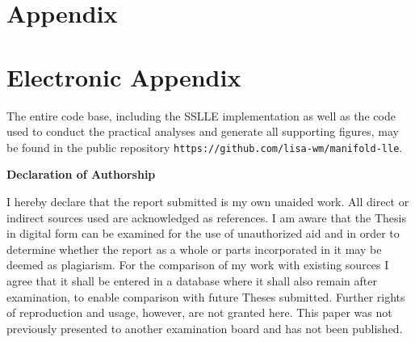 \documentclass[12pt, t]{article}
\begin{document}


\setcounter{page}{5}

\appendix

\section{Appendix}
\label{app}

\newpage

\section{Electronic Appendix}
\label{el_app}

The entire code base, including the SSLLE implementation as well as the code 
used to conduct the practical analyses and generate all supporting figures, may 
be found in the public repository 
\texttt{https://github.com/lisa-wm/manifold-lle}.

\newpage
    

\RaggedRight


\newpage


\Large
\noindent
\textbf{Declaration of Authorship} 
\vspace{0.5cm}
\noindent
\normalsize

I hereby declare that the report submitted is my own unaided work. All direct or 
indirect sources used are acknowledged as references. I am aware that the Thesis 
in digital form can be examined for the use of unauthorized aid and in order to 
determine whether the report as a whole or parts incorporated in it may be 
deemed as plagiarism. For the comparison of my work with existing sources I 
agree that it shall be entered in a database where it shall also remain after 
examination, to enable comparison with future Theses submitted. Further rights 
of reproduction and usage, however, are not granted here. This paper was not 
previously presented to another examination board and has not been published. 

\end{document}
